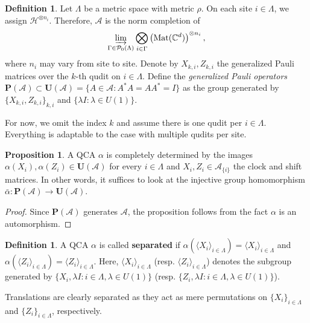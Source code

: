 \documentclass{article}
\theoremstyle{definition}
\newtheorem{defn}[theorem]{Definition}
\newtheorem{prop}[theorem]{Proposition}
\newcommand{\CC}{{\mathbb C}}
\newcommand{\SA}{{\mathscr A}}
\begin{document}
\begin{defn}
    Let $\Lambda$ be a metric space with metric $\rho$. On each site $i\in \Lambda$, we assign $\mathcal H^{\otimes n_i}$. Therefore, 
    $\SA$ is the norm completion of 
    $$\varinjlim_{\Gamma\in \mathcal P_0(\Lambda)}\bigotimes_{i\in \Gamma}\left(\mathrm{Mat}(\CC^d)\right)^{\otimes n_i},$$ where $n_i$ may vary from site to site. Denote by $X_{k,i}, Z_{k,i}$ the generalized Pauli matrices over the $k$-th qudit on $i\in \Lambda$. Define the \textit{generalized Pauli operators} $\mathbf P(\SA)\subset \mathbf U(\SA)=\{A\in \SA: A^*A=AA^*=I\}$ as the group generated by $\{X_{k,i}, Z_{k,i}\}_{k,i}$ and $\{\lambda I: \lambda\in U(1)\}$. 
\end{defn}
For now, we omit the index $k$ and assume there is one qudit per $i \in \Lambda$. Everything is adaptable to the case with multiple qudits per site. 
\begin{prop}
    A QCA $\alpha$ is completely determined by the images $\alpha(X_i), \alpha(Z_i)\in \mathbf U(\SA)$ for every $i\in \Lambda$ and $X_i, Z_i\in \SA_{\{i\}}$ the clock and shift matrices. In other words, it suffices to look at the injective group homomorphism $\bar\alpha: \mathbf P(\SA) \rightarrow \mathbf U(\SA)$.
\end{prop}
\begin{proof}
    Since $\mathbf P(\SA)$ generates $\SA$, the proposition follows from the fact $\alpha$ is an automorphism. 
\end{proof}

\begin{defn}
     A QCA $\alpha$ is called \textbf{separated} if  $\alpha(\langle X_i\rangle_{i\in \Lambda})=\langle X_i\rangle_{i\in \Lambda}$ and $\alpha(\langle Z_i\rangle_{i\in \Lambda})=\langle Z_i\rangle_{i\in \Lambda}$. Here, $\langle X_i\rangle_{i\in \Lambda}$ (resp. $\langle Z_i\rangle_{i\in \Lambda}$) denotes the subgroup generated by $\{X_i, \lambda I: i\in \Lambda, \lambda \in U(1)\}$ (resp. $\{Z_i, \lambda I: i\in \Lambda, \lambda \in U(1)\}$).
\end{defn}

Translations are clearly separated as they act as mere permutations on $\{X_i\}_{i\in \Lambda}$ and $\{Z_i\}_{i\in \Lambda}$, respectively. 
\end{document}
